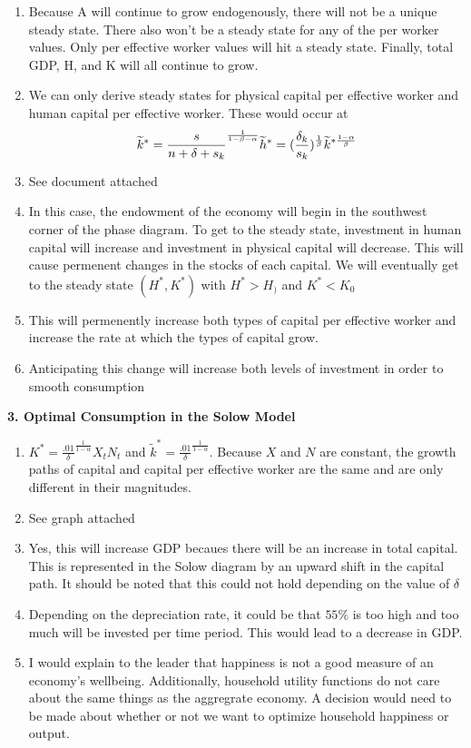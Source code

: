 \documentclass[11pt]{article}
\begin{document}
\begin{enumerate}[label=\alph*]
    \item Because A will continue to grow endogenously, there will not be a unique steady state. There also won't be a steady state for any of the per worker values. Only per effective worker values will hit a steady state. Finally, total GDP, H, and K will all continue to grow.
    \item We can only derive steady states for physical capital per effective worker and human capital per effective worker. These would occur at 
    \begin{equation}
        \widetilde{k}^* = \frac{s}{n + \delta + s_k}^\frac{1}{1 - \beta - \alpha}\\
        \widetilde{h}^* = (\frac{\delta_k}{s_k})^\frac{1}{\beta}\widetilde{k}^{*\frac{1 - \alpha}{\beta}}
    \end{equation}
    \item See document attached
    \item In this case, the endowment of the economy will begin in the southwest corner of the phase diagram. To get to the steady state, investment in human capital will increase and investment in physical capital will decrease. This will cause permenent changes in the stocks of each capital. We will eventually get to the steady state $(H^*,K^*)$ with $H^* > H_)$ and $K^* < K_0$
    \item This will permenently increase both types of capital per effective worker and increase the rate at which the types of capital grow.
    \item Anticipating this change will increase both levels of investment in order to smooth consumption
\end{enumerate}
\textbf{3. Optimal Consumption in the Solow Model}
\begin{enumerate}[label=\alph*]
    \item $K^* = \frac{.01}{\delta}^\frac{1}{1 - \alpha}X_tN_t$ and $\widetilde{k}^* = \frac{.01}{\delta}^\frac{1}{1 - \alpha}$. Because $X$ and $N$ are constant, the growth paths of capital and capital per effective worker are the same and are only different in their magnitudes.
    \item See graph attached
    \item Yes, this will increase GDP becaues there will be an increase in total capital. This is represented in the Solow diagram by an upward shift in the capital path. It should be noted that this could not hold depending on the value of $\delta$
    \item Depending on the depreciation rate, it could be that $55\%$ is too high and too much will be invested per time period. This would lead to a decrease in GDP.
    \item I would explain to the leader that happiness is not a good measure of an economy's wellbeing. Additionally, household utility functions do not care about the same things as the aggregrate economy. A decision would need to be made about whether or not we want to optimize household happiness or output.
\end{enumerate}
\end{document}
